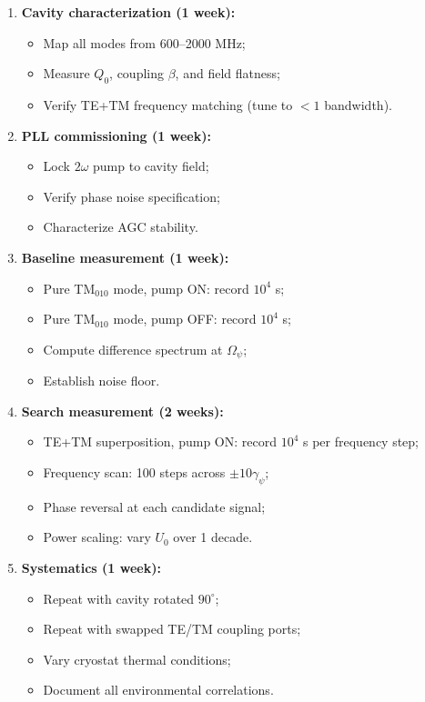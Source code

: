 \documentclass[12pt,letterpaper]{article}
\begin{document}
\begin{enumerate}
  \item \textbf{Cavity characterization (1 week):}
    \begin{itemize}[noitemsep]
      \item Map all modes from 600--2000 MHz;
      \item Measure $Q_0$, coupling $\beta$, and field flatness;
      \item Verify TE+TM frequency matching (tune to $< 1$ bandwidth).
    \end{itemize}

  \item \textbf{PLL commissioning (1 week):}
    \begin{itemize}[noitemsep]
      \item Lock $2\omega$ pump to cavity field;
      \item Verify phase noise specification;
      \item Characterize AGC stability.
    \end{itemize}

  \item \textbf{Baseline measurement (1 week):}
    \begin{itemize}[noitemsep]
      \item Pure TM$_{010}$ mode, pump ON: record $10^4$ s;
      \item Pure TM$_{010}$ mode, pump OFF: record $10^4$ s;
      \item Compute difference spectrum at $\Omega_\psi$;
      \item Establish noise floor.
    \end{itemize}

  \item \textbf{Search measurement (2 weeks):}
    \begin{itemize}[noitemsep]
      \item TE+TM superposition, pump ON: record $10^4$ s per frequency step;
      \item Frequency scan: 100 steps across $\pm 10\gamma_\psi$;
      \item Phase reversal at each candidate signal;
      \item Power scaling: vary $U_0$ over 1 decade.
    \end{itemize}

  \item \textbf{Systematics (1 week):}
    \begin{itemize}[noitemsep]
      \item Repeat with cavity rotated $90^\circ$;
      \item Repeat with swapped TE/TM coupling ports;
      \item Vary cryostat thermal conditions;
      \item Document all environmental correlations.
    \end{itemize}
\end{enumerate}
\end{document}

